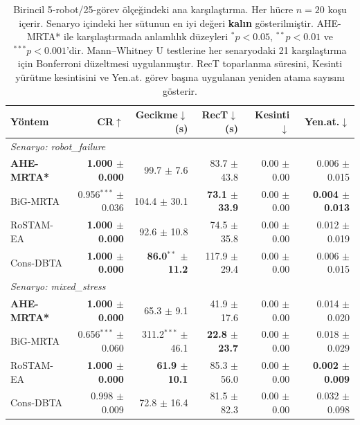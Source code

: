 \begin{table}[t]
\centering
\caption{Birincil 5-robot/25-görev ölçeğindeki ana karşılaştırma. Her hücre
$n{=}20$ koşu içerir. Senaryo içindeki her sütunun en iyi değeri
\textbf{kalın} gösterilmiştir. AHE-MRTA* ile karşılaştırmada anlamlılık
düzeyleri $^{*}p{<}0.05$, $^{**}p{<}0.01$ ve $^{***}p{<}0.001$'dir.
Mann--Whitney U testlerine her senaryodaki 21 karşılaştırma için Bonferroni
düzeltmesi uygulanmıştır. RecT toparlanma süresini, Kesinti yürütme
kesintisini ve Yen.at. görev başına uygulanan yeniden atama sayısını gösterir.}
\label{tab:main_comparison}
\small
\setlength{\tabcolsep}{3pt}
\begin{tabular}{lrrrrr}
\toprule
\textbf{Yöntem} & \textbf{CR$\uparrow$} & \textbf{Gecikme$\downarrow$(s)} & \textbf{RecT$\downarrow$(s)} & \textbf{Kesinti$\downarrow$} & \textbf{Yen.at.$\downarrow$} \\
\midrule
\multicolumn{6}{l}{\textit{Senaryo: robot\_failure}} \\
\textbf{AHE-MRTA*} & \textbf{1.000 $\pm$ 0.000} & 99.7 $\pm$ 7.6 & 83.7 $\pm$ 43.8 & 0.00 $\pm$ 0.00 & 0.006 $\pm$ 0.015 \\
BiG-MRTA & 0.956$^{***}$ $\pm$ 0.036 & 104.4 $\pm$ 30.1 & \textbf{73.1 $\pm$ 33.9} & 0.00 $\pm$ 0.00 & \textbf{0.004 $\pm$ 0.013} \\
RoSTAM-EA & \textbf{1.000 $\pm$ 0.000} & 92.6 $\pm$ 10.8 & 74.5 $\pm$ 35.8 & 0.00 $\pm$ 0.00 & 0.012 $\pm$ 0.019 \\
Cons-DBTA & \textbf{1.000 $\pm$ 0.000} & \textbf{86.0$^{**}$ $\pm$ 11.2} & 117.9 $\pm$ 29.4 & 0.00 $\pm$ 0.00 & 0.006 $\pm$ 0.015 \\
\midrule
\multicolumn{6}{l}{\textit{Senaryo: mixed\_stress}} \\
\textbf{AHE-MRTA*} & \textbf{1.000 $\pm$ 0.000} & 65.3 $\pm$ 9.1 & 41.9 $\pm$ 17.6 & 0.00 $\pm$ 0.00 & 0.014 $\pm$ 0.020 \\
BiG-MRTA & 0.656$^{***}$ $\pm$ 0.060 & 311.2$^{***}$ $\pm$ 46.1 & \textbf{22.8 $\pm$ 23.7} & 0.00 $\pm$ 0.00 & 0.018 $\pm$ 0.029 \\
RoSTAM-EA & \textbf{1.000 $\pm$ 0.000} & \textbf{61.9 $\pm$ 10.1} & 85.3 $\pm$ 56.0 & 0.00 $\pm$ 0.00 & \textbf{0.002 $\pm$ 0.009} \\
Cons-DBTA & 0.998 $\pm$ 0.009 & 72.8 $\pm$ 16.4 & 81.5 $\pm$ 82.3 & 0.00 $\pm$ 0.00 & 0.032 $\pm$ 0.098 \\
\bottomrule
\end{tabular}
\end{table}
